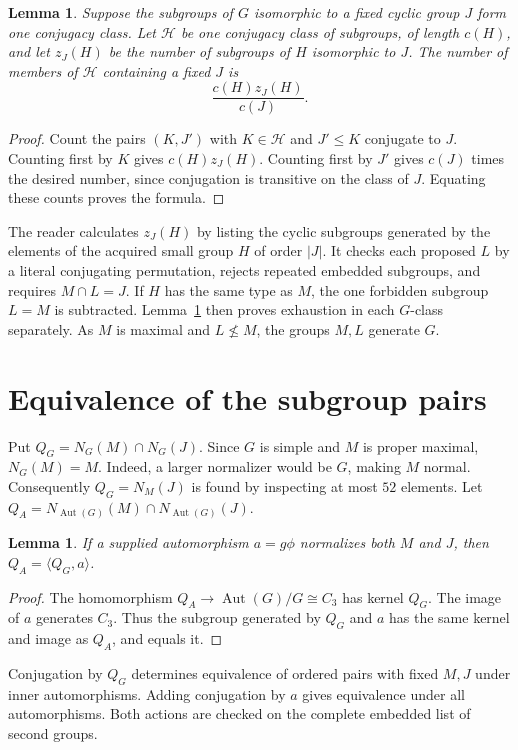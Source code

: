\documentclass[11pt]{article}
\newtheorem{lemma}[theorem]{Lemma}
\newcommand{\Aut}{\operatorname{Aut}}
\begin{document}
\begin{lemma}\label{lem:incidence}
Suppose the subgroups of $G$ isomorphic to a fixed cyclic group $J$ form
one conjugacy class. Let $\mathcal H$ be one conjugacy class of subgroups,
of length $c(H)$, and let $z_J(H)$ be the number of subgroups of $H$
isomorphic to $J$. The number of members of $\mathcal H$ containing a
fixed $J$ is
\[
             \frac{c(H)z_J(H)}{c(J)}.
\]
\end{lemma}
\begin{proof}
Count the pairs $(K,J')$ with $K\in\mathcal H$ and $J'\le K$ conjugate to
$J$. Counting first by $K$ gives $c(H)z_J(H)$. Counting first by $J'$ gives
$c(J)$ times the desired number, since conjugation is transitive on the
class of $J$. Equating these counts proves the formula.
\end{proof}

The reader calculates $z_J(H)$ by listing the cyclic subgroups generated
by the elements of the acquired small group $H$ of order $|J|$. It checks
each proposed $L$ by a literal conjugating permutation, rejects repeated
embedded subgroups, and requires $M\cap L=J$. If $H$ has the same type as
$M$, the one forbidden subgroup $L=M$ is subtracted. Lemma~\ref{lem:incidence}
then proves exhaustion in each $G$-class separately. As $M$ is maximal
and $L\nleq M$, the groups $M,L$ generate $G$.

\section{Equivalence of the subgroup pairs}
Put $Q_G=N_G(M)\cap N_G(J)$. Since $G$ is simple and $M$ is proper maximal,
$N_G(M)=M$. Indeed, a larger normalizer would be $G$, making $M$ normal.
Consequently $Q_G=N_M(J)$ is found by inspecting at most $52$ elements.
Let $Q_A=N_{\Aut(G)}(M)\cap N_{\Aut(G)}(J)$.

\begin{lemma}\label{lem:outer}
If a supplied automorphism $a=g\phi$ normalizes both $M$ and $J$, then
$Q_A=\langle Q_G,a\rangle$.
\end{lemma}
\begin{proof}
The homomorphism $Q_A\longrightarrow\Aut(G)/G\cong C_3$ has kernel
$Q_G$. The image of $a$ generates $C_3$. Thus the subgroup generated by
$Q_G$ and $a$ has the same kernel and image as $Q_A$, and equals it.
\end{proof}

Conjugation by $Q_G$ determines equivalence of ordered pairs with fixed
$M,J$ under inner automorphisms. Adding conjugation by $a$ gives equivalence
under all automorphisms. Both actions are checked on the complete embedded
list of second groups.
\end{document}
